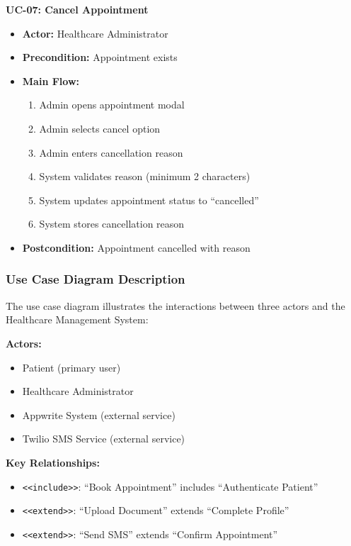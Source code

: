 \documentclass[11pt,a4paper]{article}
\begin{document}
\textbf{UC-07: Cancel Appointment}
\begin{itemize}
    \item \textbf{Actor:} Healthcare Administrator
    \item \textbf{Precondition:} Appointment exists
    \item \textbf{Main Flow:}
    \begin{enumerate}
        \item Admin opens appointment modal
        \item Admin selects cancel option
        \item Admin enters cancellation reason
        \item System validates reason (minimum 2 characters)
        \item System updates appointment status to ``cancelled''
        \item System stores cancellation reason
    \end{enumerate}
    \item \textbf{Postcondition:} Appointment cancelled with reason
\end{itemize}

\subsubsection{Use Case Diagram Description}

The use case diagram illustrates the interactions between three actors and the Healthcare Management System:

\textbf{Actors:}
\begin{itemize}
    \item Patient (primary user)
    \item Healthcare Administrator
    \item Appwrite System (external service)
    \item Twilio SMS Service (external service)
\end{itemize}

\textbf{Key Relationships:}
\begin{itemize}
    \item \texttt{<<include>>}: ``Book Appointment'' includes ``Authenticate Patient''
    \item \texttt{<<extend>>}: ``Upload Document'' extends ``Complete Profile''
    \item \texttt{<<extend>>}: ``Send SMS'' extends ``Confirm Appointment''
\end{itemize}
\end{document}

